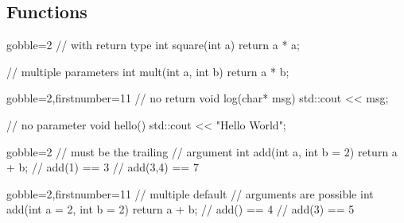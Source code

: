 \subsection[$f()$]{Functions}

\begin{frame}[fragile]
  \begin{multicols}{2}
    \begin{cppcode*}{gobble=2}
      // with return type
      int square(int a) {
        return a * a;
      }

      // multiple parameters
      int mult(int a,
               int b) {
        return a * b;
      }
    \end{cppcode*}
    \columnbreak
    \begin{cppcode*}{gobble=2,firstnumber=11}
      // no return
      void log(char* msg) {
        std::cout << msg;
      }

      // no parameter
      void hello() {
      	std::cout << "Hello World";
      }
    \end{cppcode*}
  \end{multicols}
\end{frame}

\begin{frame}[fragile]
  \begin{multicols}{2}
    \begin{cppcode*}{gobble=2}
      // must be the trailing
      // argument
      int add(int a,
              int b = 2) {
        return a + b;
      }
      // add(1) == 3
      // add(3,4) == 7

    \end{cppcode*}
    \columnbreak
    \begin{cppcode*}{gobble=2,firstnumber=11}
      // multiple default
      // arguments are possible
      int add(int a = 2,
              int b = 2) {
        return a + b;
      }
      // add() == 4
      // add(3) == 5
    \end{cppcode*}
  \end{multicols}
\end{frame}



